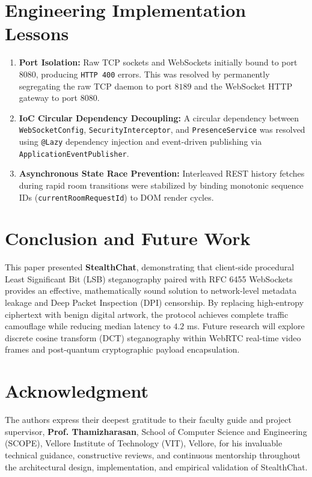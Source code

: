 \documentclass[conference]{IEEEtran}
\begin{document}
\section{Engineering Implementation Lessons}
\begin{enumerate}
    \item \textbf{Port Isolation:} Raw TCP sockets and WebSockets initially bound to port $8080$, producing \texttt{HTTP 400} errors. This was resolved by permanently segregating the raw TCP daemon to port $8189$ and the WebSocket HTTP gateway to port $8080$.
    \item \textbf{IoC Circular Dependency Decoupling:} A circular dependency between \texttt{WebSocketConfig}, \texttt{SecurityInterceptor}, and \texttt{PresenceService} was resolved using \texttt{@Lazy} dependency injection and event-driven publishing via \texttt{ApplicationEventPublisher}.
    \item \textbf{Asynchronous State Race Prevention:} Interleaved REST history fetches during rapid room transitions were stabilized by binding monotonic sequence IDs (\texttt{currentRoomRequestId}) to DOM render cycles.
\end{enumerate}

\section{Conclusion and Future Work}
This paper presented \textbf{StealthChat}, demonstrating that client-side procedural Least Significant Bit (LSB) steganography paired with RFC 6455 WebSockets provides an effective, mathematically sound solution to network-level metadata leakage and Deep Packet Inspection (DPI) censorship. By replacing high-entropy ciphertext with benign digital artwork, the protocol achieves complete traffic camouflage while reducing median latency to $4.2$ ms. Future research will explore discrete cosine transform (DCT) steganography within WebRTC real-time video frames and post-quantum cryptographic payload encapsulation.

\section*{Acknowledgment}
The authors express their deepest gratitude to their faculty guide and project supervisor, \textbf{Prof. Thamizharasan}, School of Computer Science and Engineering (SCOPE), Vellore Institute of Technology (VIT), Vellore, for his invaluable technical guidance, constructive reviews, and continuous mentorship throughout the architectural design, implementation, and empirical validation of StealthChat.
\end{document}
